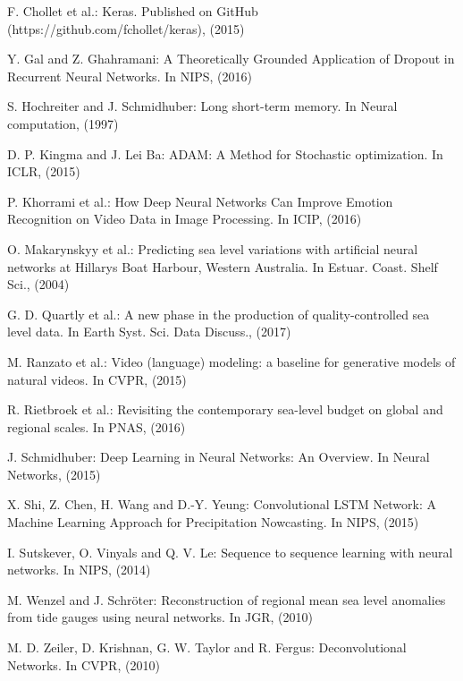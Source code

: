 \documentclass{article}
\begin{document}
\begin{thebibliography}{99}
 F. Chollet et al.: Keras. Published on GitHub (https://github.com/fchollet/keras), (2015)

 Y. Gal and Z. Ghahramani: A Theoretically Grounded Application of Dropout in Recurrent Neural Networks. In NIPS, (2016)

 S. Hochreiter and J. Schmidhuber: Long short-term memory. In Neural computation, (1997)

 D. P. Kingma and J. Lei Ba: ADAM: A Method for Stochastic optimization. In ICLR, (2015)

 P. Khorrami et al.:
How Deep Neural Networks Can Improve Emotion Recognition on Video Data in Image Processing. In ICIP, (2016)

 O. Makarynskyy et al.:
Predicting sea level variations with artificial neural networks at Hillarys Boat Harbour, Western Australia. In Estuar. Coast. Shelf Sci., (2004)

 G. D. Quartly et al.:
A new phase in the production of quality-controlled sea level data. In Earth Syst. Sci. Data Discuss., (2017)

 M. Ranzato et al.:
Video (language) modeling: a baseline for generative models of natural videos. In CVPR, (2015)

 R. Rietbroek et al.:
Revisiting the contemporary sea-level budget on global and regional scales. In PNAS, (2016)

 J. Schmidhuber: Deep Learning in Neural Networks: An Overview. In Neural Networks, (2015)

 X. Shi, Z. Chen, H. Wang and D.-Y. Yeung: Convolutional LSTM Network: A Machine Learning Approach for Precipitation Nowcasting. In NIPS, (2015)

 I. Sutskever, O. Vinyals and Q. V. Le: Sequence to sequence learning with neural networks. In NIPS, (2014)

 M. Wenzel and J. Schr\"oter: Reconstruction of regional mean sea level anomalies from tide gauges using neural networks. In JGR, (2010)

 M. D. Zeiler, D. Krishnan, G. W. Taylor and R. Fergus: Deconvolutional Networks. In CVPR, (2010)

\end{thebibliography}
\end{document}
